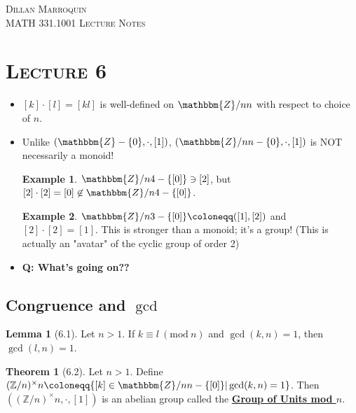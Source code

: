 \documentclass{article}
\newcommand{\Z}{\mathbbm{Z}}
\newcommand{\coleq}{\coloneqq}
\newcommand{\define}[1]{\textbf{\underline{#1}}}
\renewcommand{\mod}[1]{\ (\mathrm{mod}\ #1)}
\theoremstyle{definition}
\newtheorem*{thm}{Theorem}
\newtheorem*{ex}{Example}
\newtheorem*{lem}{Lemma}
\theoremstyle{remark}
\newcommand{\Znx}{(\mathbb{Z}/n)^\times}
\begin{document}
    \begin{center}
        \textsc{Dillan Marroquin\\MATH 331.1001 Lecture Notes\\}
    \end{center}
        
    \section*{\textbf{\textsc{Lecture 6}}}{
        \begin{itemize}
            \item $[k]\cdot[l] = [kl]$ is well-defined on $\Z/n{n}$ with respect to choice of $n$.
            \item Unlike $(\Z - \{0\},\cdot,[1])$, $(\Z/n{n} - \{0\},\cdot,[1])$ is NOT necessarily a monoid!
            \begin{ex}
                $\Z/n{4}-\{[0]\} \ni [2]$, but $[2]\cdot[2] = [0] \not \in \Z/n{4}-\{[0]\}$.
            \end{ex}
            \begin{ex}
                $\Z/n{3}- \{[0]\} \coleq ([1],[2])$ and $[2]\cdot[2] = [1]$. This is stronger than a monoid; it's a group! (This is actually an "avatar" of the cyclic group of order 2)
            \end{ex}
            \item \textbf{Q: What's going on??}
        \end{itemize}
        \subsection*{Congruence and $\gcd$}{
        
        \begin{lem}[6.1]
            Let $n>1$. If $k \equiv l\mod{n}$ and $\gcd(k,n)=1$, then $\gcd(l,n)=1$.
        \end{lem}
        
        \begin{thm}[6.2]
            Let $n>1$. Define $\Znx{n} \coleq \{[k] \in \Z/n{n}-\{[0]\}|\gcd(k,n)=1\}$. Then $(\Znx{n}, \cdot, [1])$ is an abelian group called the \define{Group of Units mod $n$}.
        \end{thm}
        
}}
\end{document}
